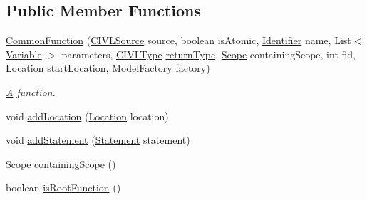 \subsection*{Public Member Functions}
\begin{DoxyCompactItemize}
\item 
\hyperlink{classedu_1_1udel_1_1cis_1_1vsl_1_1civl_1_1model_1_1common_1_1CommonFunction_a9ef146890ebd706ee403a98f5960190a}{Common\+Function} (\hyperlink{interfaceedu_1_1udel_1_1cis_1_1vsl_1_1civl_1_1model_1_1IF_1_1CIVLSource}{C\+I\+V\+L\+Source} source, boolean is\+Atomic, \hyperlink{interfaceedu_1_1udel_1_1cis_1_1vsl_1_1civl_1_1model_1_1IF_1_1Identifier}{Identifier} name, List$<$ \hyperlink{interfaceedu_1_1udel_1_1cis_1_1vsl_1_1civl_1_1model_1_1IF_1_1variable_1_1Variable}{Variable} $>$ parameters, \hyperlink{interfaceedu_1_1udel_1_1cis_1_1vsl_1_1civl_1_1model_1_1IF_1_1type_1_1CIVLType}{C\+I\+V\+L\+Type} \hyperlink{classedu_1_1udel_1_1cis_1_1vsl_1_1civl_1_1model_1_1common_1_1CommonFunction_a10255f23596c5974e8474769f03a4848}{return\+Type}, \hyperlink{interfaceedu_1_1udel_1_1cis_1_1vsl_1_1civl_1_1model_1_1IF_1_1Scope}{Scope} containing\+Scope, int fid, \hyperlink{interfaceedu_1_1udel_1_1cis_1_1vsl_1_1civl_1_1model_1_1IF_1_1location_1_1Location}{Location} start\+Location, \hyperlink{interfaceedu_1_1udel_1_1cis_1_1vsl_1_1civl_1_1model_1_1IF_1_1ModelFactory}{Model\+Factory} factory)
\begin{DoxyCompactList}\small\item\em \hyperlink{structA}{A} function. \end{DoxyCompactList}\item 
void \hyperlink{classedu_1_1udel_1_1cis_1_1vsl_1_1civl_1_1model_1_1common_1_1CommonFunction_af08d10ea201172540dac7e55a800b3de}{add\+Location} (\hyperlink{interfaceedu_1_1udel_1_1cis_1_1vsl_1_1civl_1_1model_1_1IF_1_1location_1_1Location}{Location} location)
\item 
void \hyperlink{classedu_1_1udel_1_1cis_1_1vsl_1_1civl_1_1model_1_1common_1_1CommonFunction_aaa5e02bf7028d12f09b49887f24020ae}{add\+Statement} (\hyperlink{interfaceedu_1_1udel_1_1cis_1_1vsl_1_1civl_1_1model_1_1IF_1_1statement_1_1Statement}{Statement} statement)
\item 
\hyperlink{interfaceedu_1_1udel_1_1cis_1_1vsl_1_1civl_1_1model_1_1IF_1_1Scope}{Scope} \hyperlink{classedu_1_1udel_1_1cis_1_1vsl_1_1civl_1_1model_1_1common_1_1CommonFunction_a017ff6b1c4ae39138f96dff75443043d}{containing\+Scope} ()
\item 
boolean \hyperlink{classedu_1_1udel_1_1cis_1_1vsl_1_1civl_1_1model_1_1common_1_1CommonFunction_aa54d094d1ff256eb479ab6b37156091f}{is\+Root\+Function} ()

\end{DoxyCompactItemize}
